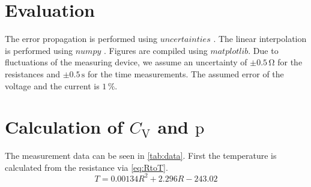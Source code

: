 \section{Evaluation}
\label{sec:Auswertung}



The error propagation is performed using $uncertainties$ \cite{unp}. The linear interpolation is performed using $numpy$ \cite{numpy}.
Figures are compiled using $matplotlib$\cite{Hunter:2007}. Due to fluctuations of the measuring device, we assume an uncertainty of
$\pm 0.5 \, \unit{\ohm}$ for the resistances and $\pm 0.5 \, \unit{\second} $ for the time measurements. 
The assumed error of the voltage and the current is $1 \, \%$.

\section{Calculation of $C_\text{V}$ and $\text{p}$}
\label{sec:CVaCp}

The measurement data can be seen in \autoref{tab:data}. First the temperature is calculated from the resistance via \eqref{eq:RtoT}.
\begin{equation}
    T = 0.00134 R^2 + 2.296 R - 243.02

\end{equation}

